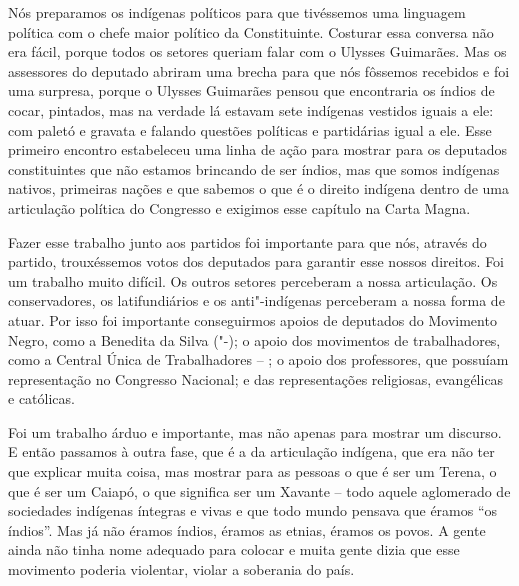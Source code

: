 Nós preparamos os indígenas políticos para que tivéssemos uma linguagem
política com o chefe maior político da Constituinte. Costurar essa
conversa não era fácil, porque todos os setores queriam falar com o
Ulysses Guimarães. Mas os assessores do deputado abriram uma brecha para
que nós fôssemos recebidos e foi uma surpresa, porque o Ulysses
Guimarães pensou que encontraria os índios de cocar, pintados, mas na
verdade lá estavam sete indígenas vestidos iguais a ele: com paletó e
gravata e falando questões políticas e partidárias igual a ele. Esse
primeiro encontro estabeleceu uma linha de ação para mostrar para os
deputados constituintes que não estamos brincando de ser índios, mas que
somos indígenas nativos, primeiras nações e que sabemos o que é o
direito indígena dentro de uma articulação política do Congresso e
exigimos esse capítulo na Carta Magna.

Fazer esse trabalho junto aos partidos foi importante para que nós,
através do partido, trouxéssemos votos dos deputados para garantir esse
nossos direitos. Foi um trabalho muito difícil. Os outros setores
perceberam a nossa articulação. Os conservadores, os latifundiários e os
anti"-indígenas perceberam a nossa forma de atuar. Por isso foi
importante conseguirmos apoios de deputados do Movimento Negro, como a
Benedita da Silva ("-); o apoio dos movimentos de trabalhadores, como
a Central Única de Trabalhadores -- ; o apoio dos professores, que
possuíam representação no Congresso Nacional; e das representações
religiosas, evangélicas e católicas.

Foi um trabalho árduo e importante, mas não apenas para mostrar um
discurso. E então passamos à outra fase, que é a da articulação
indígena, que era não ter que explicar muita coisa, mas mostrar para as
pessoas o que é ser um Terena, o que é ser um Caiapó, o que significa
ser um Xavante -- todo aquele aglomerado de sociedades indígenas
íntegras e vivas e que todo mundo pensava que éramos ``os índios''. Mas
já não éramos índios, éramos as etnias, éramos os povos. A gente ainda
não tinha nome adequado para colocar e muita gente dizia que esse
movimento poderia violentar, violar a soberania do país.

